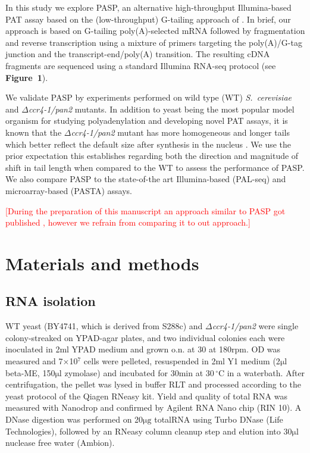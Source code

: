 \documentclass[10pt]{article}
\newcommand{\note}[1]{\textcolor{red}{[#1]}}  %
\newcommand{\mul}{\ensuremath{\mathrm{\mu l}}}
\newcommand{\C}{\,$^{\circ}\mathrm{C}$}
\begin{document}
In this study we explore PASP, an alternative high-throughput Illumina-based PAT assay based on the (low-throughput) G-tailing approach of \cite{kusov01}. In brief, our approach is based on G-tailing poly(A)-selected mRNA followed by fragmentation and reverse transcription using a mixture of primers targeting the poly(A)/G-tag junction and the transcript-end/poly(A) transition. The resulting cDNA fragments are sequenced using a standard Illumina RNA-seq protocol (see \textbf{Figure~1}).

We validate PASP by experiments performed on wild type (WT) \textit{S.~cerevisiae} and \textit{$\Delta$ccr4-1/pan2} mutants. In addition to yeast being the most popular model organism for studying polyadenylation and developing novel PAT assays, it is known that the \textit{$\Delta$ccr4-1/pan2} mutant has more homogeneous and longer tails which better reflect the default size after synthesis in the nucleus \cite{beilharz07,traven05}. We use the prior expectation this establishes regarding both the direction and magnitude of shift in tail length when compared to the WT to assess the performance of PASP. We also compare PASP to the state-of-the art Illumina-based (PAL-seq) and microarray-based (PASTA) assays.

\note{During the preparation of this manuscript an approach similar to PASP got published \cite{harrison15}, however we refrain from comparing it to out approach.}

\section*{Materials and methods}

\subsection*{RNA isolation}

WT yeast (BY4741, which is derived from S288c) and \textit{$\Delta$ccr4-1/pan2} \cite{beilharz07} were single colony-streaked on YPAD-agar plates, and two individual colonies each were inoculated in 2ml YPAD medium and grown o.n. at 30 at 180rpm. OD was measured and 7$\times$10$^7$ cells were pelleted, resuspended in 2ml Y1 medium (2{\mul} beta-ME, 150{\mul} zymolase) and incubated for 30min at 30{\C} in a waterbath. After centrifugation, the pellet was lysed in buffer RLT and processed according to the yeast protocol of the Qiagen RNeasy kit. Yield and quality of total RNA was measured with Nanodrop and confirmed by Agilent RNA Nano chip (RIN 10). A DNase digestion was performed on 20$\mathrm{\mu g}$ totalRNA using Turbo DNase (Life Technologies), followed by an RNeasy column cleanup step and elution into 30{\mul} nuclease free water (Ambion).
\end{document}
